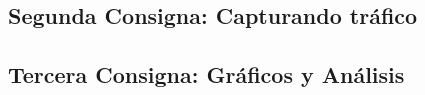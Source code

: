 \subsection{Segunda Consigna: Capturando tr\'afico}

\subsection{Tercera Consigna: Gr\'aficos y An\'alisis}

